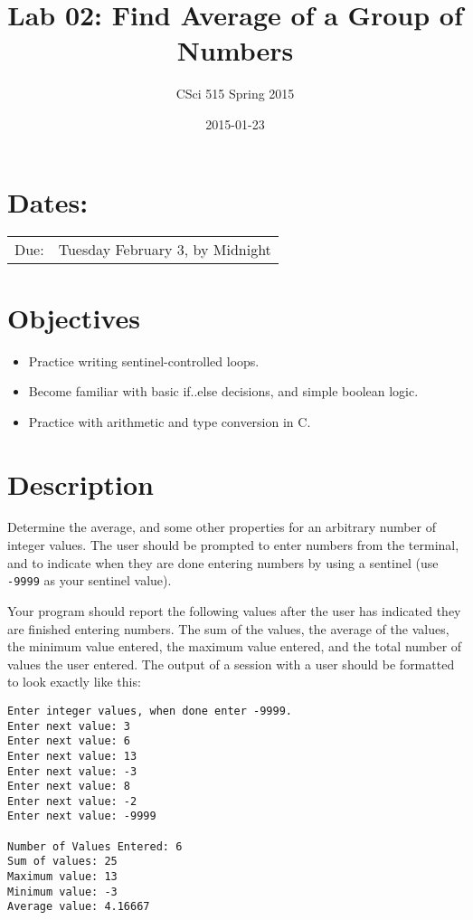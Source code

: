 \documentclass[11pt]{article}
\title{Lab 02: Find Average of a Group of Numbers}
\author{CSci 515 Spring 2015}
\date{2015-01-23}
\begin{document}
\maketitle


\section*{Dates:}
\label{sec-1}


\begin{center}
\begin{tabular}{ll}
 Due:  &  Tuesday February 3, by Midnight  \\
\end{tabular}
\end{center}
\section*{Objectives}
\label{sec-2}

\begin{itemize}
\item Practice writing sentinel-controlled loops.
\item Become familiar with basic if..else decisions, and simple boolean logic.
\item Practice with arithmetic and type conversion in C.
\end{itemize}
\section*{Description}
\label{sec-3}

Determine the average, and some other properties for an arbitrary
number of integer values.  The user should be prompted to enter
numbers from the terminal, and to indicate when they are done entering
numbers by using a sentinel (use \verb~-9999~ as your sentinel value).

Your program should report the following values after the user has
indicated they are finished entering numbers.  The sum of the values,
the average of the values, the minimum value entered, the maximum
value entered, and the total number of values the user entered.  The
output of a session with a user should be formatted to look exactly
like this:


\begin{verbatim}
Enter integer values, when done enter -9999.
Enter next value: 3
Enter next value: 6
Enter next value: 13
Enter next value: -3
Enter next value: 8
Enter next value: -2
Enter next value: -9999

Number of Values Entered: 6
Sum of values: 25
Maximum value: 13
Minimum value: -3
Average value: 4.16667
\end{verbatim}
\end{document}

